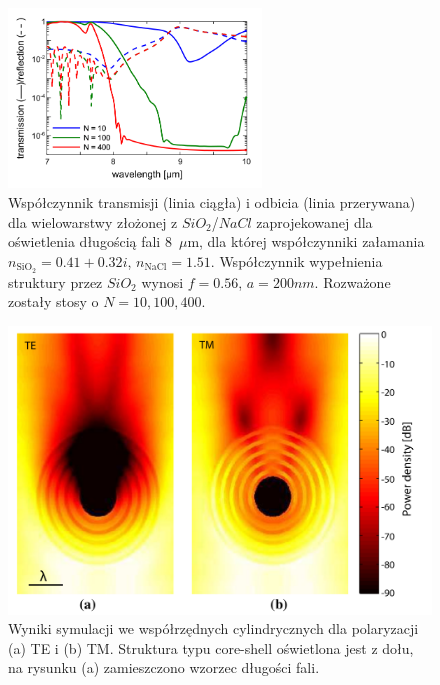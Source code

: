 \begin{figure}[tb]
	\centering
	\includegraphics[width=0.6\textwidth]{images/pml/oqe_trans_refl.png}
	\caption{Współczynnik transmisji (linia ciągła) i odbicia (linia przerywana) dla wielowarstwy złożonej z $SiO_2$/$NaCl$ zaprojekowanej dla oświetlenia długością fali 8~$\mu$m, dla której współczynniki załamania $n_{\textrm{SiO}_2}=0.41+0.32i$, $n_{\textrm{NaCl}}=1.51$. Współczynnik wypełnienia struktury przez $SiO_2$ wynosi $f=0.56$, $a=200nm$. Rozważone zostały stosy o $N=10,100,400$.}
	\label{fig:oqe-trans-refl}
\end{figure}

\begin{figure}[tb]
	\includegraphics[width=\textwidth]{images/pml/oqe_coreshell.png}
	\caption{Wyniki symulacji we współrzędnych cylindrycznych dla polaryzacji (a) TE i (b) TM. Struktura typu core-shell oświetlona jest z dołu, na rysunku (a) zamieszczono wzorzec długości fali.}
\end{figure}


